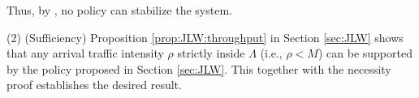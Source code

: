 \documentclass[10pt, conference, letterpaper]{IEEEtran} %
\begin{document}
Thus, by \cite[Theorem 3.3.10]{srikant2013communication}, no policy can stabilize the system.

(2) (Sufficiency) Proposition \ref{prop:JLW:throughput} in Section \ref{sec:JLW} shows that any arrival traffic intensity $\rho$ strictly inside $\Lambda$ (i.e., $\rho<M$) can be supported by the policy proposed in Section \ref{sec:JLW}. This together with the necessity proof establishes the desired result.
%


\begin{spacing}{}



\end{spacing}
\end{document}
